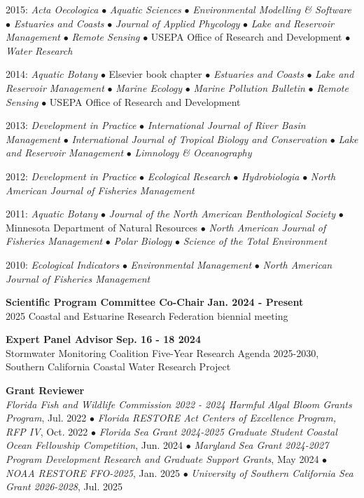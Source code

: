 \documentclass[letterpaper,12pt]{article}
\begin{document}
2015: \textit{Acta Oecologica} $\bullet$ \textit{Aquatic Sciences} $\bullet$ \textit{Environmental Modelling \& Software} $\bullet$ \textit{Estuaries and Coasts} $\bullet$ \textit{Journal of Applied Phycology} $\bullet$ \textit{Lake and Reservoir Management} $\bullet$ \textit{Remote Sensing} $\bullet$ USEPA Office of Research and Development $\bullet$ \textit{Water Research}

2014: \textit{Aquatic Botany} $\bullet$ Elsevier book chapter $\bullet$ \textit{Estuaries and Coasts} $\bullet$ \textit{Lake and Reservoir Management} $\bullet$ \textit{Marine Ecology} $\bullet$ \textit{Marine Pollution Bulletin} $\bullet$ \textit{Remote Sensing} $\bullet$ USEPA Office of Research and Development

2013: \textit{Development in Practice} $\bullet$ \textit{International Journal of River Basin Management} $\bullet$ \textit{International Journal of Tropical Biology and Conservation} $\bullet$ \textit{Lake and Reservoir Management} $\bullet$ \textit{Limnology \& Oceanography}

2012: \textit{Development in Practice} $\bullet$ \textit{Ecological Research} $\bullet$ \textit{Hydrobiologia} $\bullet$ \textit{North American Journal of Fisheries Management}

2011: \textit{Aquatic Botany} $\bullet$ \textit{Journal of the North American Benthological Society} $\bullet$ Minnesota Department of Natural Resources $\bullet$ \textit{North American Journal of Fisheries Management} $\bullet$ \textit{Polar Biology} $\bullet$ \textit{Science of the Total Environment}

2010: \textit{Ecological Indicators} $\bullet$ \textit{Environmental Management} $\bullet$ \textit{North American Journal of Fisheries Management}

{\bf Scientific Program Committee Co-Chair} \hfill {\bf Jan. 2024 - Present} \\
2025 Coastal and Estuarine Research Federation biennial meeting

{\bf Expert Panel Advisor} \hfill {\bf Sep. 16 - 18 2024} \\
Stormwater Monitoring Coalition Five-Year Research Agenda 2025-2030, Southern California Coastal Water Research Project

{\bf Grant Reviewer} \hfill \\
\textit{Florida Fish and Wildlife Commission 2022 - 2024 Harmful Algal Bloom Grants Program}, Jul. 2022 $\bullet$ \textit{Florida RESTORE Act Centers of Excellence Program, RFP IV}, Oct. 2022 $\bullet$ \textit{Florida Sea Grant 2024-2025 Graduate Student Coastal Ocean Fellowship Competition}, Jun. 2024 $\bullet$ \textit{Maryland Sea Grant 2024-2027 Program Development Research and Graduate Support Grants}, May 2024 $\bullet$ \textit{NOAA RESTORE FFO-2025}, Jan. 2025 $\bullet$ \textit{University of Southern California Sea Grant 2026-2028}, Jul. 2025
\end{document}
